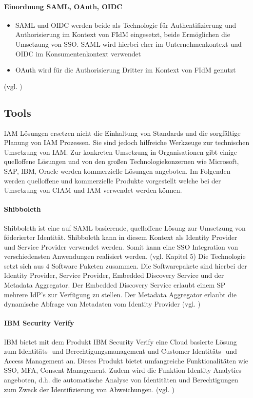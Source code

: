 \documentclass[11pt]{article}
\begin{document}
\paragraph{Einordnung SAML, OAuth, OIDC}
\begin{itemize}
  \item SAML und OIDC werden beide als Technologie für Authentifizierung und Authorisierung im Kontext von FIdM eingesetzt, beide Ermöglichen die Umsetzung von SSO. SAML wird hierbei eher im Unternehmenkontext und OIDC im Konsumentenkontext verwendet
  \item OAuth wird für die Authorisierung Dritter im Kontext von FIdM genutzt
\end{itemize}
(vgl. \cite{naik2017choice})
\subsection{Tools}
IAM Lösungen ersetzen nicht die Einhaltung von Standards und die sorgfältige Planung von IAM Prozessen. Sie sind jedoch hilfreiche Werkzeuge zur technischen Umsetzung von IAM. Zur konkreten Umsetzung in Organisationen gibt einige quelloffene Lösungen und von den großen Technologiekonzernen wie Microsoft, SAP, IBM, Oracle werden kommerzielle Lösungen angeboten. Im Folgenden werden quelloffene und kommerzielle Produkte vorgestellt welche bei der Umsetzung von CIAM und IAM verwendet werden können.
\paragraph{Shibboleth}
Shibboleth ist eine auf SAML basierende, quelloffene Lösung zur Umsetzung von föderierter Identität. Shibboleth kann in diesem Kontext als Identity Provider und Service Provider verwendet werden. Somit kann eine SSO Integration von verschiedensten Anwendungen realisiert werden. (vgl. \cite{kamal2015shibboleth} Kapitel 5) Die Technologie setzt sich aus 4 Software Paketen zusammen. Die Softwarepakete sind hierbei der Identity Provider, Service Provider, Embedded Discovery Service und der Metadata Aggregator. Der Embedded Discovery Service erlaubt einem SP mehrere IdP's zur Verfügung zu stellen. Der Metadata Aggregator erlaubt die dynamische Abfrage von Metadaten vom Identity Provider (vgl. \cite{shibboleth2024software})
\paragraph{IBM Security Verify}
IBM bietet mit dem Produkt \glqq{}IBM Security Verify\grqq{} eine Cloud basierte Lösung zum Identitäts- und Berechtigungsmanagement und Customer Identitäts- und Access Management an. Dieses Produkt bietet umfangreiche Funktionalitäten wie SSO, MFA, Consent Management. Zudem wird die Funktion Identity Analytics angeboten, d.h. die automatische Analyse von Identitäten und Berechtigungen zum Zweck der Identifizierung von Abweichungen. (vgl. \cite{ibm2024verify})
\end{document}
